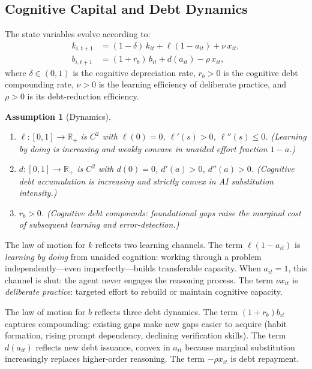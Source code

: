 \documentclass[12pt]{article}
\newtheorem{assumption}{Assumption}
\newcommand{\R}{\mathbb{R}}
\begin{document}
\subsection{Cognitive Capital and Debt Dynamics}
\label{sec:dynamics}

The state variables evolve according to:
\begin{align}
k_{i,t+1} &= (1-\delta)\, k_{it} + \ell(1 - a_{it}) + \nu\, x_{it}, \label{eq:k_law}\\
b_{i,t+1} &= (1 + r_b)\, b_{it} + d(a_{it}) - \rho\, x_{it}, \label{eq:b_law}
\end{align}
where $\delta \in (0,1)$ is the cognitive depreciation rate, $r_b > 0$ is the
cognitive debt compounding rate, $\nu > 0$ is the learning efficiency of
deliberate practice, and $\rho > 0$ is its debt-reduction efficiency.

\begin{assumption}[Dynamics]
\label{ass:dynamics}
\begin{enumerate}
\item[\emph{(i)}] $\ell : [0,1] \to \R_+$ is $C^2$ with $\ell(0) = 0$,
$\ell'(s) > 0$, $\ell''(s) \leq 0$. (Learning by doing is increasing and weakly
concave in unaided effort fraction $1-a$.)
\item[\emph{(ii)}] $d : [0,1] \to \R_+$ is $C^2$ with $d(0) = 0$,
$d'(a) > 0$, $d''(a) > 0$. (Cognitive debt accumulation is increasing and strictly
convex in AI substitution intensity.)
\item[\emph{(iii)}] $r_b > 0$. (Cognitive debt compounds: foundational gaps raise
the marginal cost of subsequent learning and error-detection.)
\end{enumerate}
\end{assumption}

The law of motion for $k$ reflects two learning channels. The term
$\ell(1-a_{it})$ is \emph{learning by doing} from unaided cognition: working
through a problem independently---even imperfectly---builds transferable capacity.
When $a_{it} = 1$, this channel is shut: the agent never engages the reasoning
process. The term $\nu x_{it}$ is \emph{deliberate practice}: targeted effort to
rebuild or maintain cognitive capacity.

The law of motion for $b$ reflects three debt dynamics. The term $(1+r_b) b_{it}$
captures compounding: existing gaps make new gaps easier to acquire (habit formation,
rising prompt dependency, declining verification skills). The term $d(a_{it})$
reflects new debt issuance, convex in $a_{it}$ because marginal substitution increasingly
replaces higher-order reasoning. The term $-\rho x_{it}$ is debt repayment.
\end{document}
